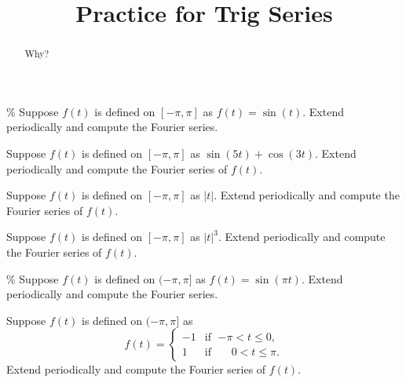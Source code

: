 \documentclass{ximera}
\title{Practice for Trig Series}
\begin{document}
\begin{abstract}
Why?
\end{abstract}
\maketitle



\begin{exercise}\%
    Suppose $f(t)$ is defined on $[-\pi,\pi]$ as $f(t) = \sin(t)$.  Extend periodically and compute the Fourier series.
\end{exercise}

\begin{exercise}
    Suppose $f(t)$ is defined on $[-\pi,\pi]$ as $\sin (5t) + \cos (3t)$.  Extend periodically and compute the Fourier series of $f(t)$.
\end{exercise}

\begin{exercise}
    Suppose $f(t)$ is defined on $[-\pi,\pi]$ as $\lvert t \rvert$. Extend periodically and compute the Fourier series of $f(t)$.
\end{exercise}

\begin{exercise}
    Suppose $f(t)$ is defined on $[-\pi,\pi]$ as $\lvert t \rvert^3$. Extend periodically and compute the Fourier series of $f(t)$.
\end{exercise}

\begin{exercise}\%
    Suppose $f(t)$ is defined on $(-\pi,\pi]$ as $f(t) = \sin(\pi t)$.  Extend periodically and compute the Fourier series.
\end{exercise}

\begin{exercise}
    Suppose $f(t)$ is defined on $(-\pi,\pi]$ as
    \begin{equation*}
        f(t) =
        \begin{cases}
            -1 & \text{if } \; {-\pi} < t \leq 0 , \\
            1 & \text{if } \; \phantom{-}0 < t \leq \pi .
        \end{cases}
    \end{equation*}
    Extend periodically and compute the Fourier series of $f(t)$.
\end{exercise}
\end{document}
